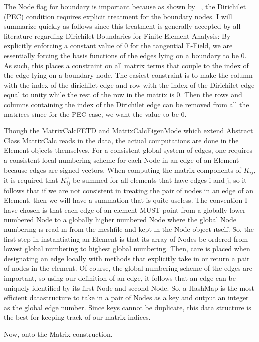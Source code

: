 \documentclass[11pt,a4paper,oldfontcommands]{memoir}
\begin{document}
The Node flag for boundary is important because as shown by ~\cite{Jin}, the Dirichilet (PEC) condition requires explicit treatment for the boundary nodes. I will summarize quickly as follows since this treatment is generally accepted by all literature regarding Dirichilet Boundaries for Finite Element Analysis: By explicitly enforcing a constant value of 0 for the tangential E-Field, we are essentially forcing the basis functions of the edges lying on a boundary to be 0. As such, this places a constraint on all matrix terms that couple to the index of the edge lying on a boundary node. The easiest constraint is to make the column with the index of the dirichilet edge and row with the index of the Dirichilet edge equal to unity while the rest of the row in the matrix is 0. Then the rows and columns containing the index of the Dirichilet edge can be removed from all the matrices since for the PEC case, we want the value to be 0.

Though the MatrixCalcFETD and MatrixCalcEigenMode which extend Abstract Class MatrixCalc reads in the data, the actual computations are done in the Element objects themselves. For a consistent global system of edges, one requires a consistent local numbering scheme for each Node in an edge of an Element because edges are signed vectors. When computing the matrix components of $K_{ij}$, it is required that $K_{ij}^e$ be summed for all elements that have edges i and j, so it follows that if we are not consistent in treating the pair of nodes in an edge of an Element, then we will have a summation that is quite useless. 
The convention I have chosen is that each edge of an element MUST point from a globally lower numbered Node to a globally higher numbered Node where the global Node numbering is read in from the meshfile and kept in the Node object itself. So, the first step in instantiating an Element is that its array of Nodes be ordered from lowest global numbering to highest global numbering.
Then, care is placed when designating an edge locally with methods that explicitly take in or return a pair of nodes in the element. 
Of course, the global numbering scheme of the edges are important, so using our definition of an edge, it follows that an edge can be uniquely identified by its first Node and second Node. So, a HashMap is the most efficient datastructure to take in a pair of Nodes as a key and output an integer as the global edge number. Since keys cannot be duplicate, this data structure is the best for keeping track of our matrix indices.

Now, onto the Matrix construction.
\end{document}
